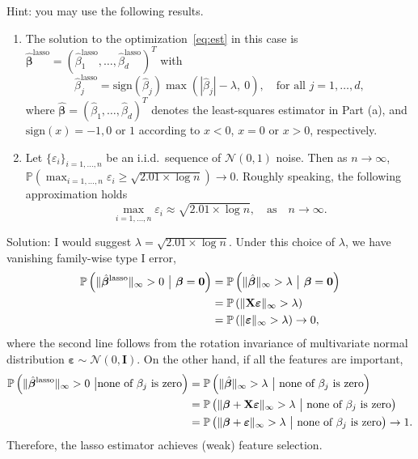 \documentclass[12pt]{article}
\def\mX{\mathbf{X}}
\def\mI{\mathbf{I}}
\def\bbeta{{\boldsymbol{\beta}}}
\def\bepsilon{\boldsymbol{\varepsilon}}
\def\tN{\mathcal{N}}
\newcommand{\normSize}[2]{#1\lVert#2#1\rVert}
\begin{document}
\begin{enumerate}
\begin{enumerate}
Hint: you may use the following results. 

\begin{enumerate}
\item The solution to the optimization~\eqref{eq:est} in this case is $\hat \bbeta^{\text{lasso}}=(\hat \beta^{\text{lasso}}_1,\ldots,\hat \beta^{\text{lasso}}_d)^T$ with
\[
\hat \beta^{\text{lasso}}_j=\text{sign}(\hat \beta_j)\max(|\hat \beta_j|-\lambda,\ 0),\quad \text{for all } j=1,\ldots,d,
\]
where $\hat \bbeta=(\hat \beta_1, \ldots,\hat \beta_d)^T$ denotes the least-squares estimator in Part (a), and $\text{sign}(x)=-1, 0$ or $1$ according to $x<0$, $x=0$ or $x>0$, respectively.

\item Let $\{\varepsilon_i\}_{i=1,\ldots,n}$ be an i.i.d.\ sequence of $\tN(0,1)$ noise. Then as $n\to \infty$, $\mathbb{P}(\max_{i=1,\ldots,n} \varepsilon_i \geq \sqrt{2.01\times \log n}) \to 0$. Roughly speaking, the following approximation holds
\[
\max_{i=1,\ldots,n} \varepsilon_i \approx \sqrt{2.01\times \log n},\quad \text{as}\quad n\to\infty.
\]
\end{enumerate}

{\color{red} Solution:
I would suggest $\lambda=\sqrt{2.01\times \log n}$. Under this choice of $\lambda$, we have vanishing family-wise type I error,
\begin{align}
\mathbb{P}\left( \normSize{}{\hat \bbeta^{\text{lasso}}}_{\infty}> 0 \ \big|\ \bbeta={\bf 0} \right) &=\mathbb{P}\left( \normSize{}{\hat \bbeta}_{\infty} > \lambda \ \big|\ \bbeta={\bf 0} \right) \notag \\
&=\mathbb{P}\left( \normSize{}{\mX\bepsilon}_{\infty}>\lambda \right)\notag \\
&=\mathbb{P}\left( \normSize{}{\bepsilon}_{\infty}> \lambda \right)\to 0\notag,
\end{align}
where the second line follows from the rotation invariance of multivariate normal distribution $\bepsilon\sim \mathcal{N}(0,\mI)$.
On the other hand, if all the features are important, 
\begin{align}
\mathbb{P}\left( \normSize{}{\hat \bbeta^{\text{lasso}}}_{\infty}> 0 \ \big|\text{none of $\beta_j$ is zero}\right) &=\mathbb{P}\left( \normSize{}{\hat \bbeta}_{\infty} > \lambda \ \big|\ \text{none of $\beta_j$ is zero}\right) \notag \\
&=\mathbb{P}\left( \normSize{}{\bbeta+\mX\bepsilon}_{\infty}>\lambda \ \big|\ \text{none of $\beta_j$ is zero} \right)\notag \\
&=\mathbb{P}\left( \normSize{}{\bbeta+\bepsilon}_{\infty}> \lambda \ \big|\ \text{none of $\beta_j$ is zero}\right)\to 1\notag .
\end{align}
Therefore, the lasso estimator achieves (weak) feature selection. 
}
\end{enumerate}
\end{enumerate}
\clearpage

\end{document}
